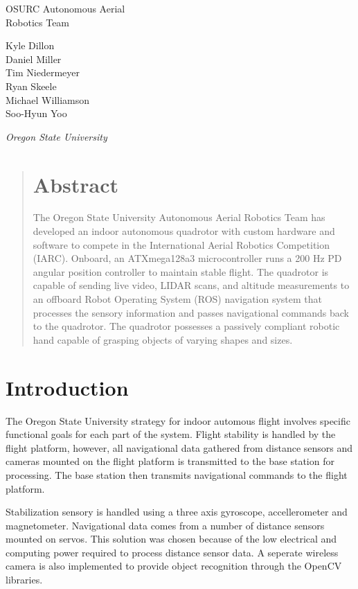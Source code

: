 \documentclass[12pt,letterpaper]{article}
\begin{document}
\begin{center}
{\huge
    OSURC Autonomous Aerial \\ Robotics Team\\[1cm]
}
{
Kyle Dillon \\
Daniel Miller \\
Tim Niedermeyer \\
Ryan Skeele \\
Michael Williamson \\
Soo-Hyun Yoo \\ \vspace{0.5em}

\emph{Oregon State University}
}

\end{center}

\begin{quote}
\section*{Abstract}

The Oregon State University Autonomous Aerial Robotics Team has developed
an indoor autonomous quadrotor with custom hardware and software to compete
in the International Aerial Robotics Competition (IARC). Onboard, an
ATXmega128a3 microcontroller runs a 200 Hz PD angular position controller
to maintain stable flight. The quadrotor is capable of sending live video,
LIDAR scans, and altitude measurements to an offboard Robot Operating
System (ROS) navigation system that processes the sensory information and
passes navigational commands back to the quadrotor. The quadrotor possesses
a passively compliant robotic hand capable of grasping objects of varying
shapes and sizes.
\end{quote}


\section*{Introduction}

The Oregon State University strategy for indoor automous flight involves
specific functional goals for each part of the system. Flight stability is
handled by the flight platform, however, all navigational data gathered from
distance sensors and cameras mounted on the flight platform is transmitted to
the base station for processing. The base station then transmits navigational
commands to the flight platform.

Stabilization sensory is handled using a three axis gyroscope, 
accellerometer and magnetometer. Navigational data comes from a number of
distance sensors mounted on servos. This solution was chosen because of the
low electrical and computing power required to process distance sensor data.
A seperate wireless camera is also implemented to provide object recognition
through the OpenCV libraries.
\end{document}

